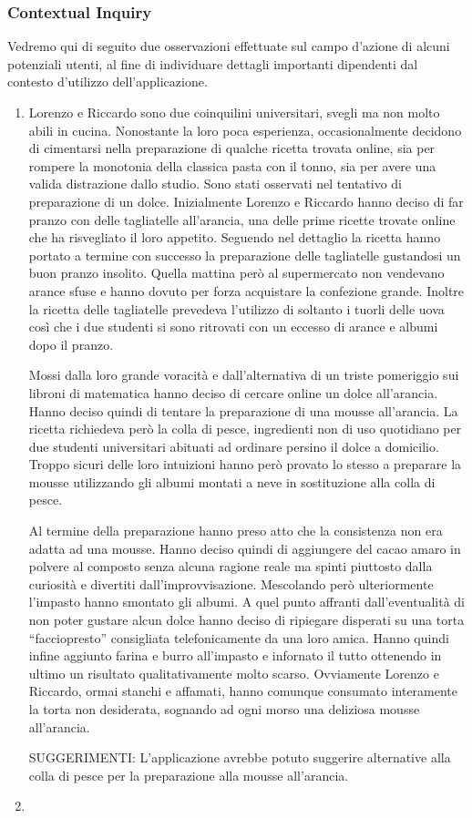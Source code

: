 \subsubsection{Contextual Inquiry}
Vedremo qui di seguito due osservazioni effettuate sul campo d'azione
di alcuni potenziali utenti, al fine di individuare dettagli importanti
dipendenti dal contesto d'utilizzo dell'applicazione.

\begin{enumerate}
\item Lorenzo e Riccardo sono due coinquilini universitari, svegli ma non molto
abili in cucina. Nonostante la loro poca esperienza, occasionalmente
decidono di cimentarsi nella preparazione di qualche ricetta trovata
online, sia per rompere la monotonia della classica pasta con il tonno,
sia per avere una valida distrazione dallo studio.
Sono stati osservati nel tentativo di preparazione di un dolce.
Inizialmente Lorenzo e Riccardo hanno deciso di far pranzo con delle
tagliatelle all'arancia, una delle prime ricette trovate online che ha risvegliato il
loro appetito. Seguendo nel dettaglio la ricetta hanno portato a termine
con successo la preparazione delle tagliatelle gustandosi un buon
pranzo insolito. 
Quella mattina però al supermercato non vendevano
arance sfuse e hanno dovuto per forza acquistare la confezione grande.
Inoltre la ricetta delle tagliatelle prevedeva l'utilizzo di soltanto i
tuorli delle uova così che i due studenti si sono ritrovati con un
eccesso di arance e albumi dopo il pranzo.

Mossi dalla loro grande voracità e dall'alternativa di un triste pomeriggio sui libroni di
matematica hanno deciso di cercare online un dolce all'arancia.
Hanno deciso quindi di tentare la preparazione di una mousse
all'arancia. La ricetta richiedeva però la colla di pesce, ingredienti non di uso
quotidiano per due studenti universitari abituati ad ordinare persino il
dolce a domicilio. Troppo sicuri delle loro intuizioni hanno però
provato lo stesso a preparare la mousse utilizzando gli albumi montati a
neve in sostituzione alla colla di pesce. 

Al termine della preparazione hanno preso atto che la consistenza non era adatta ad una mousse. 
Hanno deciso quindi di aggiungere del cacao amaro in
polvere al composto senza alcuna ragione reale ma spinti piuttosto dalla curiosità e divertiti
dall'improvvisazione. Mescolando però ulteriormente l'impasto hanno smontato
gli albumi. A quel punto affranti dall'eventualità di non poter gustare
alcun dolce hanno deciso di ripiegare disperati su una torta
``facciopresto'' consigliata telefonicamente da una loro amica. Hanno
quindi infine aggiunto farina e burro all'impasto e infornato il tutto
ottenendo in ultimo un risultato qualitativamente molto scarso.
Ovviamente Lorenzo e Riccardo, ormai stanchi e affamati, hanno comunque consumato interamente la
torta non desiderata, sognando ad ogni morso una deliziosa mousse all'arancia.

SUGGERIMENTI:
L'applicazione avrebbe potuto suggerire
alternative alla colla di pesce per la preparazione alla
mousse all'arancia.
\item
\end{enumerate}

